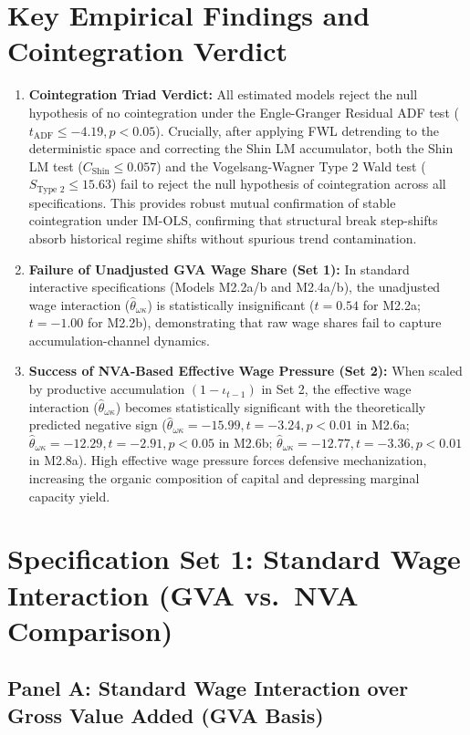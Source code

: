 \documentclass[11pt,a4paper]{article}
\begin{document}
\section*{Key Empirical Findings and Cointegration Verdict}
\begin{enumerate}
    \item \textbf{Cointegration Triad Verdict:} All estimated models reject the null hypothesis of no cointegration under the Engle-Granger Residual ADF test ($t_{\text{ADF}} \le -4.19, p < 0.05$). Crucially, after applying FWL detrending to the deterministic space and correcting the Shin LM accumulator, both the Shin LM test ($C_{\text{Shin}} \le 0.057$) and the Vogelsang-Wagner Type 2 Wald test ($S_{\text{Type 2}} \le 15.63$) fail to reject the null hypothesis of cointegration across all specifications. This provides robust mutual confirmation of stable cointegration under IM-OLS, confirming that structural break step-shifts absorb historical regime shifts without spurious trend contamination.
    \item \textbf{Failure of Unadjusted GVA Wage Share (Set 1):} In standard interactive specifications (Models M2.2a/b and M2.4a/b), the unadjusted wage interaction ($\hat{\theta}_{\omega\kappa}$) is statistically insignificant ($t = 0.54$ for M2.2a; $t = -1.00$ for M2.2b), demonstrating that raw wage shares fail to capture accumulation-channel dynamics.
    \item \textbf{Success of NVA-Based Effective Wage Pressure (Set 2):} When scaled by productive accumulation $(1-\iota_{t-1})$ in Set 2, the effective wage interaction ($\hat{\theta}_{\omega\kappa}$) becomes statistically significant with the theoretically predicted negative sign ($\hat{\theta}_{\omega\kappa} = -15.99, t = -3.24, p < 0.01$ in M2.6a; $\hat{\theta}_{\omega\kappa} = -12.29, t = -2.91, p < 0.05$ in M2.6b; $\hat{\theta}_{\omega\kappa} = -12.77, t = -3.36, p < 0.01$ in M2.8a). High effective wage pressure forces defensive mechanization, increasing the organic composition of capital and depressing marginal capacity yield.
\end{enumerate}

\FloatBarrier
\section{Specification Set 1: Standard Wage Interaction (GVA vs.\ NVA Comparison)}

\subsection{Panel A: Standard Wage Interaction over Gross Value Added (GVA Basis)}
\FloatBarrier

\end{document}
